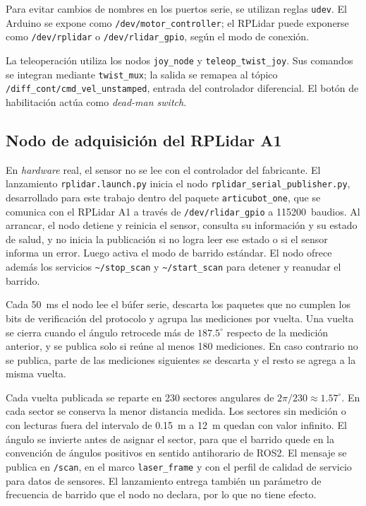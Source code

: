 \begin{appendices}
Para evitar cambios de nombres en los puertos serie, se utilizan reglas \texttt{udev}. El \gls{Arduino} se expone como \texttt{/dev/motor\_controller}; el RPLidar puede exponerse como \texttt{/dev/rplidar} o \texttt{/dev/rlidar\_gpio}, según el modo de conexión.

La teleoperación utiliza los nodos \texttt{joy\_node} y
\texttt{teleop\_twist\_joy}. Sus comandos se integran mediante
\texttt{twist\_mux}; la salida se remapea al tópico
\texttt{/diff\_cont/cmd\_vel\_unstamped}, entrada del controlador
diferencial. El botón de habilitación actúa como
\textit{dead-man switch}.

\subsection{Nodo de adquisición del RPLidar A1}
\label{anx:nodo_lidar}

En \textit{hardware} real, el sensor no se lee con el controlador del fabricante. El
lanzamiento \texttt{rplidar.launch.py} inicia el nodo
\texttt{rplidar\_serial\_publisher.py}, desarrollado para este trabajo dentro
del paquete \texttt{articubot\_one}, que se comunica con el RPLidar A1 a través
de \texttt{/dev/rlidar\_gpio} a 115200~baudios. Al arrancar, el nodo detiene y
reinicia el sensor, consulta su información y su estado de salud, y no inicia
la publicación si no logra leer ese estado o si el sensor informa un error.
Luego activa el modo de barrido estándar. El nodo ofrece además los servicios
\texttt{\textasciitilde/stop\_scan} y \texttt{\textasciitilde/start\_scan} para
detener y reanudar el barrido.

Cada 50~ms el nodo lee el búfer serie, descarta los paquetes que no cumplen
los bits de verificación del protocolo y agrupa las mediciones por vuelta. Una
vuelta se cierra cuando el ángulo retrocede más de $187.5^\circ$ respecto de la
medición anterior, y se publica solo si reúne al menos 180 mediciones. En caso
contrario no se publica, parte de las mediciones siguientes se descarta y el
resto se agrega a la misma vuelta.

Cada vuelta publicada se reparte en 230 sectores angulares de
$2\pi/230\approx1.57^\circ$. En cada sector se conserva la menor distancia
medida. Los sectores sin medición o con lecturas fuera del intervalo de 0.15~m
a 12~m quedan con valor infinito. El ángulo se invierte antes de asignar el
sector, para que el barrido quede en la convención de ángulos positivos en
sentido antihorario de \gls{ROS2}. El mensaje se publica en \texttt{/scan}, en
el marco \texttt{laser\_frame} y con el perfil de calidad de servicio para
datos de sensores. El lanzamiento entrega también un parámetro de frecuencia de
barrido que el nodo no declara, por lo que no tiene efecto.


\end{appendices}
